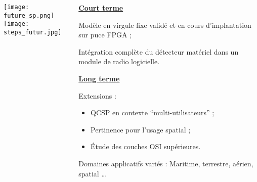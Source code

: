 \documentclass[../main.tex]{subfiles}
\begin{document}
\begin{frame}{\subsecname}
  \begin{columns}
    \begin{column}{.3 \linewidth}
      \hfill \texttt{[image: future\_sp.png]} \\
      \texttt{[image: steps\_futur.jpg]}
    \end{column}
    \begin{column}{.7 \linewidth}
      {\centering \underline{\textbf{Court terme}}\par}
      \begin{ctrlitemize}{.2 em} \small
        \item Modèle en virgule fixe validé et en cours d'implantation sur puce FPGA ;
        \item Intégration complète du détecteur matériel dans un module de radio logicielle.
      \end{ctrlitemize}

      {\centering \underline{\textbf{Long terme}}\par}
      \begin{ctrlitemize}{.2 em} \small
        \item Extensions :
        \begin{itemize}
          \item QCSP en contexte ``multi-utilisateurs'' ;
          \item Pertinence pour l'usage spatial ;
          \item Étude des couches OSI supérieures.
        \end{itemize}
        \item Domaines applicatifs variés : Maritime, terrestre, aérien, spatial \dots
      \end{ctrlitemize}
    \end{column}
  \end{columns}
\end{frame}
\end{document}
